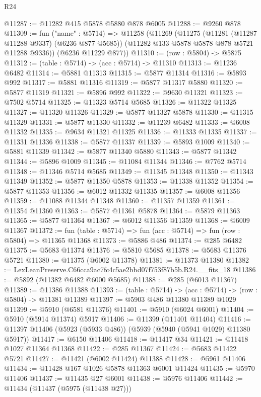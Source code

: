 \begin{lexlean}{R24}
\begin{coremodule}
@11287 := @11282 @415 @5878 @5880 @878 @6005
@11288 := @9260 @878
@11309 := fun ("name" : @5714) =>
  @11258
    (@11269
      (@11275
        (@11281 (@11287 @11288 @9337) (@6236 @877 @5685))
        (@11282 @133 @5878 @5878 @878 @5721 @11288 @9336))
      (@6236 @11229 @877))
@11310 := (row : @5804) -> @5875
@11312 := (table : @5714) -> (acc : @5714) -> @11310
@11313 := @11236 @6482
@11314 := @5881 @11313
@11315 := @5877 @11314
@11316 := @5893 @992
@11317 := @5881 @11316
@11319 := @5877 @11317 @5880
@11320 := @5877 @11319
@11321 := @5896 @992
@11322 := @9630 @11321
@11323 := @7502 @5714
@11325 := @11323 @5714 @5685
@11326 := @11322 @11325
@11327 := @11320 @11326
@11329 := @5877 @11327 @5878
@11330 := @11315 @11329
@11331 := @5877 @11330
@11332 := @11239 @6482
@11333 := @6008 @11332
@11335 := @9634 @11321 @11325
@11336 := @11333 @11335
@11337 := @11331 @11336
@11338 := @5877 @11337
@11339 := @5893 @1009
@11340 := @5881 @11339
@11342 := @5877 @11340 @5880
@11343 := @5877 @11342
@11344 := @5896 @1009
@11345 := @11084 @11344
@11346 := @7762 @5714
@11348 := @11346 @5714 @5685
@11349 := @11345 @11348
@11350 := @11343 @11349
@11352 := @5877 @11350 @5878
@11353 := @11338 @11352
@11354 := @5877 @11353
@11356 := @6012 @11332 @11335
@11357 := @6008 @11356
@11359 := @11088 @11344 @11348
@11360 := @11357 @11359
@11361 := @11354 @11360
@11363 := @5877 @11361 @5878
@11364 := @5879 @11363
@11365 := @5877 @11364
@11367 := @6012 @11356 @11359
@11368 := @6009 @11367
@11372 := fun (table : @5714) => fun (acc : @5714) => fun (row : @5804) => @11365 @11368
@11373 := @5886 @486
@11374 := @285 @6482
@11375 := @5683 @11374
@11376 := @5810 @5685
@11378 := @5683 @11376 @5721
@11380 := @11375 (@6002 @11378)
@11381 := @11373 @11380
@11382 := LexLeanPreserve.C66cca9ac7fc4c5ae2bbd07f753f87b5b.R24.__fits_18
@11386 := @5892 (@11382 @6482 @6000 @5685)
@11388 := @285 (@6013 @11367)
@11389 := @11386 @11388
@11393 := (table : @5714) -> (acc : @5714) -> (row : @5804) -> @11381 @11389
@11397 := @5903 @486 @11380 @11389 @1029
@11399 := @5910 (@6581 @11376)
@11401 := @5910 (@6024 @6001)
@11404 := @5910 (@5914 @11374) @5917
@11406 := @11399 (@11401 @11404)
@11416 := @11397 @11406 (@5923 (@5933 @486)) (@5939 (@5940 (@5941 @1029) @11380 @5917))
@11417 := @6150 @11406
@11418 := @11417 @34
@11421 := @11418 @1027 @11364 @11368
@11422 := @285 @11367
@11424 := @5683 @11422 @5721
@11427 := @11421 (@6002 @11424) @11388
@11428 := @5961 @11406
@11434 := @11428 @167 @1026 @5878 @11363 @6001 @11424
@11435 := @5970 @11406
@11437 := @11435 @27 @6001
@11438 := @5976 @11406
@11442 := @11434 (@11437 (@5975 (@11438 @27)))

\end{coremodule}
\end{lexlean}
